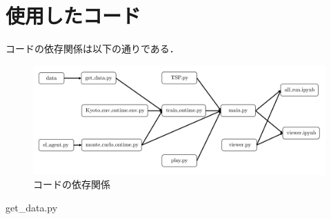 \documentclass[a4paper,12pt]{jsreport}
\theoremstyle{definition}
\begin{document}
\appendix

\chapter{使用したコード}
コードの依存関係は以下の通りである．
\begin{figure}[htbp]
    \centering
    \includegraphics[width=13cm]{izon.png}
    \caption{コードの依存関係}
    \label{fig:izon}
\end{figure}
\newpage
get\_data.py
\end{document}
